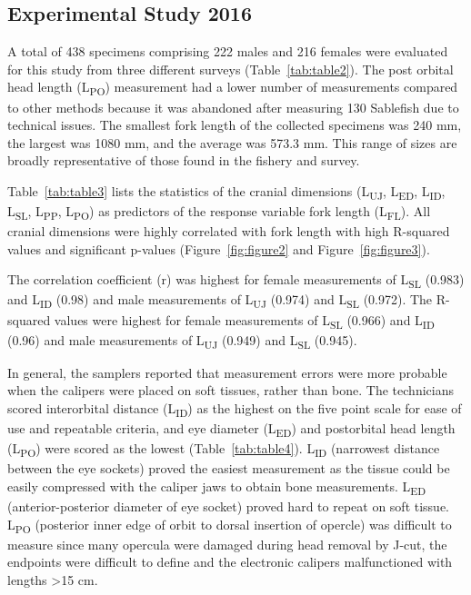 \documentclass[12pt]{article}\usepackage[]{graphicx}\usepackage[]{color}
\begin{document}
\hypertarget{experimental-study-2016-1}{%
\subsection{Experimental Study 2016}\label{experimental-study-2016-1}}

A total of 438 specimens comprising 222 males and 216 females were evaluated for this study from three different surveys (Table~\ref{tab:table2}). The post orbital head length (L\textsubscript{PO}) measurement had a lower number of measurements compared to other methods because it was abandoned after measuring 130 Sablefish due to technical issues. The smallest fork length of the collected specimens was 240 mm, the largest was 1080 mm, and the average was 573.3 mm. This range of sizes are broadly representative of those found in the fishery and survey.

Table~\ref{tab:table3} lists the statistics of the cranial dimensions (L\textsubscript{UJ}, L\textsubscript{ED}, L\textsubscript{ID}, L\textsubscript{SL}, L\textsubscript{PP}, L\textsubscript{PO}) as predictors of the response variable fork length (L\textsubscript{FL}). All cranial dimensions were highly correlated with fork length with high R-squared values and significant p-values (Figure~\ref{fig:figure2} and Figure~\ref{fig:figure3}).

The correlation coefficient (r) was highest for female measurements of L\textsubscript{SL} (0.983) and L\textsubscript{ID} (0.98) and male measurements of L\textsubscript{UJ} (0.974) and L\textsubscript{SL} (0.972). The R-squared values were highest for female measurements of L\textsubscript{SL} (0.966) and L\textsubscript{ID} (0.96) and male measurements of L\textsubscript{UJ} (0.949) and L\textsubscript{SL} (0.945).

In general, the samplers reported that measurement errors were more probable when the calipers were placed on soft tissues, rather than bone. The technicians scored interorbital distance (L\textsubscript{ID}) as the highest on the five point scale for ease of use and repeatable criteria, and eye diameter (L\textsubscript{ED}) and postorbital head length (L\textsubscript{PO}) were scored as the lowest (Table~\ref{tab:table4}). L\textsubscript{ID} (narrowest distance between the eye sockets) proved the easiest measurement as the tissue could be easily compressed with the caliper jaws to obtain bone measurements. L\textsubscript{ED} (anterior-posterior diameter of eye socket) proved hard to repeat on soft tissue. L\textsubscript{PO} (posterior inner edge of orbit to dorsal insertion of opercle) was difficult to measure since many opercula were damaged during head removal by J-cut, the endpoints were difficult to define and the electronic calipers malfunctioned with lengths \textgreater15 cm.
\end{document}
